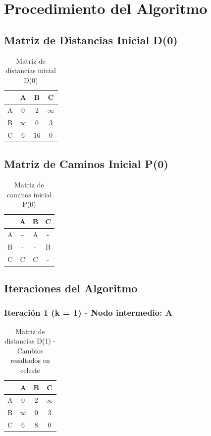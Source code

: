 \documentclass[12pt]{article}
\begin{document}
\clearpage
\section{Procedimiento del Algoritmo}
\subsection{Matriz de Distancias Inicial D(0)}
\begin{table}[h!]
\centering
\begin{tabular}{|c|c|c|c|}
\hline
 & A & B & C \\\hline
A & 0 & 2 & $\infty$ \\\hline
B & $\infty$ & 0 & 3 \\\hline
C & 6 & 16 & 0 \\\hline
\end{tabular}
\caption{Matriz de distancias inicial D(0)}
\end{table}

\clearpage
\subsection{Matriz de Caminos Inicial P(0)}
\begin{table}[h!]
\centering
\begin{tabular}{|c|c|c|c|}
\hline
 & A & B & C \\\hline
A & - & A & - \\\hline
B & - & - & B \\\hline
C & C & C & - \\\hline
\end{tabular}
\caption{Matriz de caminos inicial P(0)}
\end{table}

\clearpage
\subsection{Iteraciones del Algoritmo}
\subsubsection{Iteración 1 (k = 1) - Nodo intermedio: A}
\begin{table}[h!]
\centering
\begin{tabular}{|c|c|c|c|}
\hline
 & A & B & C \\\hline
A & 0 & 2 & $\infty$ \\\hline
B & $\infty$ & 0 & 3 \\\hline
C & 6 & \cellcolor{lightgreen} 8 & 0 \\\hline
\end{tabular}
\caption{Matriz de distancias D(1) - Cambios resaltados en celeste}
\end{table}
\end{document}
